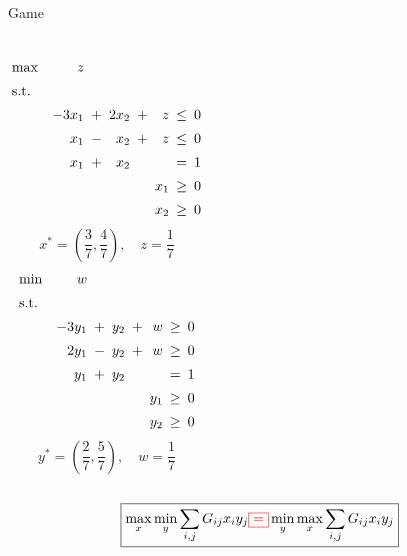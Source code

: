 \begin{frame}{Game}
  \begin{columns}
	  \begin{equation*}
		\setlength\arraycolsep{2.5pt}
		\begin{array}{l@{\quad}rcrcrcr}
		  \max 	& z &	&	&	&	&	&	\\[5pt]
		  \text{s.t.} 	&	&	&	&	&	&	&	\\[5pt]
		  &	-3x_1 &+&	2x_2	&+&	z	&\leq& 0 \\[5pt]
		  &	x_1	  &-&	x_2 	&+& z 	&\leq& 0 \\[5pt]
		  & x_1   &+&	x_2		& &		&=&	1 \\[5pt]
		  &		&&				&&	x_1 &\geq& 0 \\[5pt]
		  &		&&				&&	x_2 &\geq& 0
		\end{array}
	  \end{equation*}
	  \[
		x^{\ast} = (\frac{3}{7}, \frac{4}{7}), \quad z = \frac{1}{7}
	  \]
	  \begin{equation*}
		\setlength\arraycolsep{2.5pt}
		\begin{array}{l@{\quad}rcrcrcr}
		  \min 	& w &	&	&	&	&	&	\\[5pt]
		  \text{s.t.} 	&	&	&	&	&	&	&	\\[5pt]
		  &	-3y_1 &+&	y_2		&+&	w	&\geq& 0 \\[5pt]
		  &	2y_1  &-&	y_2 	&+& w 	&\geq& 0 \\[5pt]
		  & y_1   &+&	y_2		& &		&=&	1 \\[5pt]
		  &		&&				&&	y_1 &\geq& 0 \\[5pt]
		  &		&&				&&	y_2 &\geq& 0
		\end{array}
	  \end{equation*}
	  \[
		y^{\ast} = (\frac{2}{7}, \frac{5}{7}), \quad w = \frac{1}{7}
	  \]
  \end{columns}

  \vspace{0.50cm}
  \[
	\boxed{\max_{x} \min_{y} \sum_{i,j} G_{ij} x_i y_j \textcolor{red}{\boxed{=}} \min_{y} \max_{x} \sum_{i,j} G_{ij} x_i y_j}
  \]
\end{frame}
